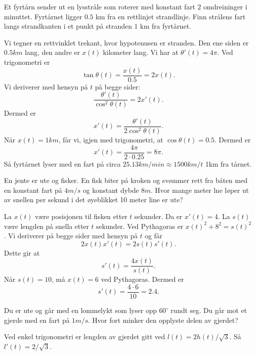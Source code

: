 \documentclass[11pt, norsk]{article}
\begin{document}
\begin{oppg}[7.3]
Et fyrtårn sender ut en lysstråle som roterer med konstant fart $2$ omdreininger i minuttet. Fyrtårnet ligger $0.5$ km fra en rettlinjet strandlinje. Finn strålens fart langs strandkanten i et punkt på stranden $1$ km fra fyrtårnet.
\end{oppg}

\begin{losn}
Vi tegner en rettvinklet trekant, hvor hypotenusen er stranden. Den ene siden er $0.5 km$ lang, den andre er $x(t)$ kilometer lang. Vi har at $\theta'(t)=4 \pi$. Ved trigonometri er
$$
\tan \theta(t) = \frac{x(t)}{0.5} = 2x(t).
$$
Vi deriverer med hensyn på $t$ på begge sider:
$$
\frac{\theta'(t)}{\cos^2 \theta(t)} = 2 x'(t).
$$
Dermed er 
$$
x'(t) = \frac{\theta'(t)}{2 \cos^2 \theta(t)}.
$$
Når $x(t)=1 km$, får vi, igjen med trigonometri, at $\cos \theta(t)=0.5$. Dermed er 
$$
x'(t) = \frac{4 \pi}{2 \cdot 0.25} = 8 \pi.
$$
Så fyrtårnet lyser med en fart på circa $25.13 km/min \approx 1500 km/t$ 1km fra tårnet.
\end{losn}

\begin{oppg}[7.5]
En jente er ute og fisker. En fisk biter på kroken og svømmer rett fra båten med en konstant fart på $4 m/s$ og konstant dybde $8 m$. Hvor mange meter lne løper ut av snellen per sekund i det øyeblikket 10 meter line er ute?
\end{oppg}

\begin{losn}
La $x(t)$ være posisjonen til fisken etter $t$ sekunder. Da er $x'(t)=4$. La $s(t)$ være lengden på snella etter $t$ sekunder. Ved Pythagoras er $x(t)^2 +8^2 = s(t)^2$. Vi deriverer på begge sider med hensyn på $t$ og får
$$
2x(t)x'(t) = 2s(t) s'(t).
$$
Dette gir at
$$
s'(t) = \frac{4x(t)}{s(t)}.
$$
Når $s(t)=10$, må $x(t)=6$ ved Pythagoras. Dermed er 
$$
s'(t) = \frac{4 \cdot 6}{10} = 2.4.
$$
\end{losn}

\begin{oppg}[7.7]
Du er ute og går med en lommelykt som lyser opp $60^\circ$ rundt seg. Du går mot et gjerde med en fart på $1 m/s$. Hvor fort minker den opplyste delen av gjerdet?
\end{oppg}

\begin{losn}
Ved enkel trigonometri er lengden av gjerdet gitt ved $l(t) = 2h(t)/\sqrt{3}$. Så $l'(t)= 2/\sqrt{3}$.
\end{losn}
\end{document}
